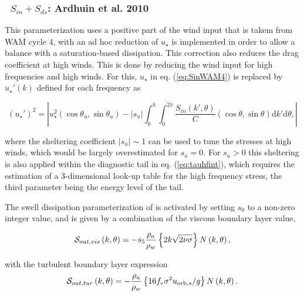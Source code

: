 \vsssub
\subsubsection{~$S_{in} + S_{ds}$: Ardhuin et al. 2010} \label{sec:ST4}
\vsssub


\noindent 
This parameterization uses a positive part of the wind input that is takem
from WAM cycle 4, with an ad hoc reduction of $u_\star$ is implemented in
order to allow a balance with a saturation-based dissipation.  This correction
also reduces the drag coefficient at high winds. This is done by reducing the
wind input for high frequencies and high winds. For this, $u_\star$ in
eq. (\ref{eq:SinWAM4}) is replaced by $u_\star '(k)$ defined for each
frequency as

\begin{equation}
\left(u_\star '\right)^2=\left|u_\star^2 \left(\cos \theta_u, \sin
\theta_u \right) - \left|s_u\right| \int_0^k \int_0^{2 \pi}
\frac{S_{in}\left(k',\theta \right)}{C}  \left(\cos \theta, \sin
\theta \right)  {\mathrm d} k' \mathrm d
\theta,\label{ustarp}\right|
\end{equation}

\noindent 
where the sheltering coefficient $\left|s_u\right|\sim 1$ can be used to tune
the stresses at high winds, which would be largely overestimated for
$s_u=0$. For $s_u > 0$ this sheltering is also applied within the diagnostic
tail in eq. (\ref{eq:tauhfint}), which requires the estimation of a
3-dimensional look-up table for the high frequency stress, the third parameter
being the energy level of the tail.

The swell dissipation parameterization of \cite{art:ACC09} is activated by
setting $s_0$ to a non-zero integer value, and is given by a combination of
the viscous boundary layer value,

\begin{equation}
{\cal S}_{out,vis}\left(k,\theta\right) = - s_5 \frac{\rho_a}{\rho_w}\left\{ 2 k \sqrt{2
\nu \sigma}\right\}  N \left(k,\theta\right) \label{Sds_turb},\label{eq:Dore}
\end{equation}

\noindent
with the turbulent boundary layer expression 
\begin{equation}
{\cal S}_{out,tur} \left(k,\theta\right) = - \frac{\rho_a}{\rho_w}\left\{  16 f_e
\sigma^2 u_{\mathrm{orb},s} / g \right\}
 N\left(k,\theta\right) \label{Sds_visc}.\label{eq:swell_turb}
\end{equation}

